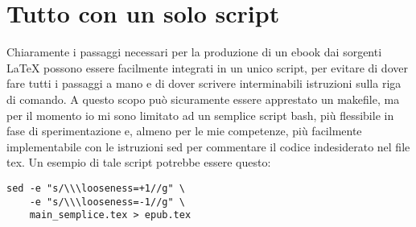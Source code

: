 \chapter{Tutto con un solo script}
Chiaramente i passaggi necessari per la produzione di un ebook dai sorgenti 
\LaTeX{} possono essere facilmente integrati in un unico script, per evitare di
dover fare tutti i passaggi a mano e di dover scrivere interminabili istruzioni 
sulla riga di comando. A questo scopo può sicuramente essere apprestato un 
makefile, ma per il momento io mi sono limitato ad un semplice script bash, più 
flessibile in fase di sperimentazione e, almeno per le mie competenze, più 
facilmente implementabile con le istruzioni sed per commentare il codice 
indesiderato nel file tex. Un esempio di tale script potrebbe essere questo:

\begin{lstlisting}
sed -e "s/\\\looseness=+1//g" \
    -e "s/\\\looseness=-1//g" \
    main_semplice.tex > epub.tex
\end{lstlisting}
